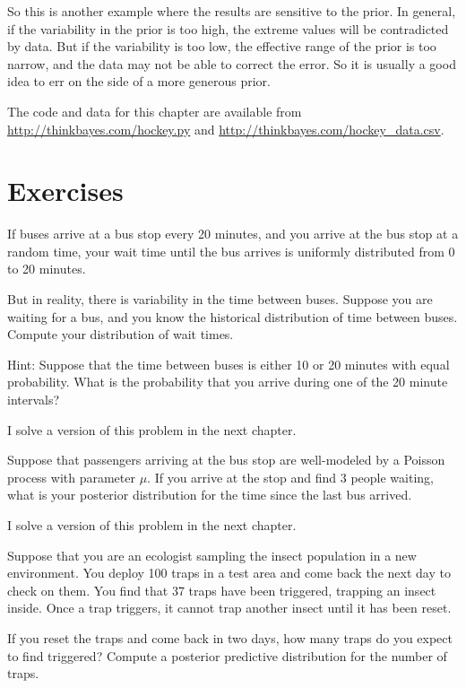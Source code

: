 \documentclass[12pt]{book}
\begin{document}
So this is another example where the results are sensitive to the
prior.  In general, if the variability in the prior is too high, the
extreme values will be contradicted by data.  But if the
variability is too low, the effective range of the prior is too
narrow, and the data may not be able to correct the error.  So it is
usually a good idea to err on the side of a more generous prior.

The code and data for this chapter are available from
\url{http://thinkbayes.com/hockey.py} and
\url{http://thinkbayes.com/hockey_data.csv}.


\section{Exercises}

\begin{exercise}

If buses arrive at a bus stop every 20 minutes, and you
arrive at the bus stop at a random time, your wait time until
the bus arrives is uniformly distributed from 0 to 20 minutes.

But in reality, there is variability in the time between
buses.  Suppose you are waiting for a bus, and you know the historical
distribution of time between buses.  Compute your distribution
of wait times.

Hint: Suppose that the time between buses is either
10 or 20 minutes with equal probability.  What is the probability
that you arrive during one of the 20 minute intervals?

I solve a version of this problem in the next chapter.

\end{exercise}


\begin{exercise}

Suppose that passengers arriving at the bus stop are well-modeled
by a Poisson process with parameter $\mu$.  If you arrive at the
stop and find 3 people waiting, what is your posterior distribution
for the time since the last bus arrived.

I solve a version of this problem in the next chapter.

\end{exercise}


\begin{exercise}

Suppose that you are an ecologist sampling the insect population in
a new environment.  You deploy 100 traps in a test area and come back
the next day to check on them.  You find that 37 traps have been
triggered, trapping an insect inside.  Once a trap triggers, it
cannot trap another insect until it has been reset.

If you reset the traps and come back in two days, how many traps
do you expect to find triggered?  Compute a posterior predictive
distribution for the number of traps.

\end{exercise}
\end{document}
